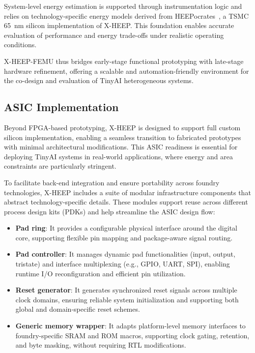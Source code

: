                 System-level energy estimation is supported through instrumentation logic and relies on technology-specific energy models derived from \mbox{HEEPocrates}~\cite{heepocrates}, a TSMC \SI{65}{\nano\meter} silicon implementation of \mbox{X-HEEP}. This foundation enables accurate evaluation of performance and energy trade-offs under realistic operating conditions.
                
                \mbox{X-HEEP-FEMU} thus bridges early-stage functional prototyping with late-stage hardware refinement, offering a scalable and automation-friendly environment for the co-design and evaluation of TinyAI heterogeneous systems.

        \subsection{ASIC Implementation}
        
            Beyond FPGA-based prototyping, \mbox{X-HEEP} is designed to support full custom silicon implementation, enabling a seamless transition to fabricated prototypes with minimal architectural modifications. This ASIC readiness is essential for deploying TinyAI systems in real-world applications, where energy and area constraints are particularly stringent.
            
            To facilitate back-end integration and ensure portability across foundry technologies, \mbox{X-HEEP} includes a suite of modular infrastructure components that abstract technology-specific details. These modules support reuse across different process design kits (PDKs) and help streamline the ASIC design flow:

            \vspace{-1em}
            \begin{itemize}
                \item \textbf{Pad ring}: It provides a configurable physical interface around the digital core, supporting flexible pin mapping and package-aware signal routing.
            
                \item \textbf{Pad controller}: It manages dynamic pad functionalities (input, output, tristate) and interface multiplexing (e.g., GPIO, UART, SPI), enabling runtime I/O reconfiguration and efficient pin utilization.
            
                \item \textbf{Reset generator}: It generates synchronized reset signals across multiple clock domains, ensuring reliable system initialization and supporting both global and domain-specific reset schemes.
            
                \item \textbf{Generic memory wrapper}: It adapts platform-level memory interfaces to foundry-specific SRAM and ROM macros, supporting clock gating, retention, and byte masking, without requiring RTL modifications.
            \end{itemize}
            \vspace{-1em}
            
